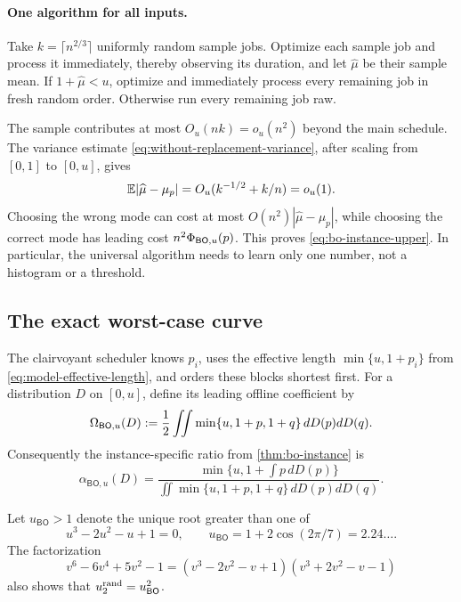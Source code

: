 \paragraph{One algorithm for all inputs.}
Take $k=\lceil n^{2/3}\rceil$ uniformly random sample jobs.  Optimize each
sample job and process it immediately, thereby observing its duration, and let
$\widehat\mu$ be their sample mean.  If $1+\widehat\mu<u$, optimize and
immediately process every remaining job in fresh random order.  Otherwise
run every remaining job raw.

The sample contributes at most $O_u(nk)=o_u(n^2)$ beyond the main schedule.
The variance estimate \cref{eq:without-replacement-variance}, after scaling
from $[0,1]$ to $[0,u]$, gives
\[
 \mathbb{E}|\widehat\mu-\mu_p|=O_u(k^{-1/2}+k/n)=o_u(1).
\]
Choosing the wrong mode can cost at most
$O(n^2)|\widehat\mu-\mu_p|$, while choosing the correct mode has leading
cost $n^2\Phi_{\mathsf{BO},u}(p)$.  This proves
\eqref{eq:bo-instance-upper}.  In particular, the universal algorithm needs to
learn only one number, not a histogram or a threshold.

\subsection{The exact worst-case curve}

The clairvoyant scheduler knows $p_i$, uses the effective length
$\min\{u,1+p_i\}$ from \cref{eq:model-effective-length}, and orders these
blocks shortest first.  For a distribution $D$ on $[0,u]$, define its
leading offline coefficient by
\begin{equation}
 \Omega_{\mathsf{BO},u}(D)
 \mathrel{:=}\frac12\iint
  \min\{u,1+p,1+q\}\,dD(p)dD(q).
 \label{eq:bo-offline-coefficient}
\end{equation}
Consequently the instance-specific ratio from
\cref{thm:bo-instance} is
\begin{equation}
 \alpha_{\mathsf{BO},u}(D)
 =\frac{\min\{u,1+\int p\,dD(p)\}}
        {\iint\min\{u,1+p,1+q\}\,dD(p)dD(q)}.
 \label{eq:bo-instance-ratio}
\end{equation}

Let $u_{\mathsf{BO}}>1$ denote the unique root greater than one of
\begin{equation}
 u^3-2u^2-u+1=0,
 \qquad
 u_{\mathsf{BO}}=1+2\cos(2\pi/7)=2.24\ldots .
 \label{eq:bo-transition}
\end{equation}
The factorization
\[
 v^6-6v^4+5v^2-1
 =(v^3-2v^2-v+1)(v^3+2v^2-v-1)
\]
also shows that $u_{2}^{\mathrm{rand}}=u_{\mathsf{BO}}^2$.

